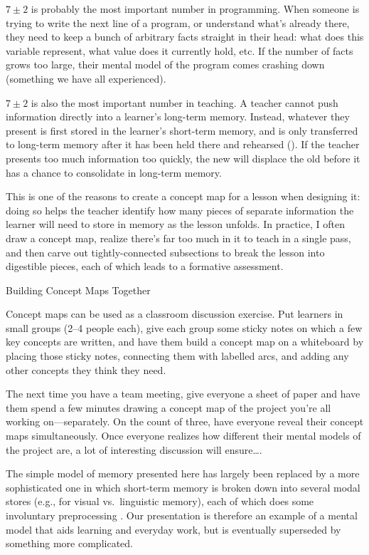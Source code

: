 $7{\pm}2$ is probably the most important number in programming. When
someone is trying to write the next line of a program, or understand
what's already there, they need to keep a bunch of arbitrary facts
straight in their head: what does this variable represent, what value
does it currently hold, etc. If the number of facts grows too large,
their mental model of the program comes crashing down (something we
have all experienced).

$7{\pm}2$ is also the most important number in teaching. A teacher
cannot push information directly into a learner's long-term memory.
Instead, whatever they present is first stored in the learner's
short-term memory, and is only transferred to long-term memory after
it has been held there and rehearsed
().  If the teacher presents too much
information too quickly, the new will displace the old before it has a
chance to consolidate in long-term memory.

This is one of the reasons to create a concept map for a lesson when
designing it: doing so helps the teacher identify how many pieces of
separate information the learner will need to store in memory as the
lesson unfolds.  In practice, I often draw a concept map, realize
there's far too much in it to teach in a single pass, and then carve
out tightly-connected subsections to break the lesson into digestible
pieces, each of which leads to a formative assessment.

\begin{callout}{Building Concept Maps Together}

  Concept maps can be used as a classroom discussion exercise. Put
  learners in small groups (2--4 people each), give each group some
  sticky notes on which a few key concepts are written, and have them
  build a concept map on a whiteboard by placing those sticky notes,
  connecting them with labelled arcs, and adding any other concepts
  they think they need.

  The next time you have a team meeting, give everyone a sheet of
  paper and have them spend a few minutes drawing a concept map of the
  project you're all working on---separately. On the count of three,
  have everyone reveal their concept maps simultaneously. Once
  everyone realizes how different their mental models of the project
  are, a lot of interesting discussion will ensure{\ldots}.

\end{callout}

The simple model of memory presented here has largely been replaced by
a more sophisticated one in which short-term memory is broken down
into several modal stores (e.g., for visual vs.\ linguistic memory),
each of which does some involuntary preprocessing \cite{Mill2016a}.
Our presentation is therefore an example of a mental model that aids
learning and everyday work, but is eventually superseded by something
more complicated.

